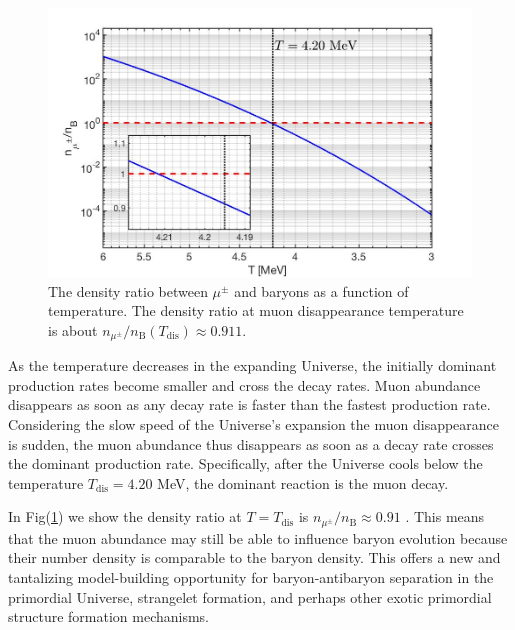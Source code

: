 \documentclass[universe,article,submit,moreauthors,pdftex,a4paper]{Definitions/mdpi}
\begin{document}
\begin{figure}[t]
\centering
\includegraphics[width=0.9\columnwidth]{./plots/DensityRatio_new2.jpg}
\caption{The density ratio between $\mu^\pm$ and baryons as a function of temperature. The density ratio at muon disappearance temperature is about $n_{\mu^\pm}/n_\mathrm{B}(T_\mathrm{dis})\approx0.911$.}
\label{muonRatio_fig} 
\end{figure}
As the temperature decreases in the expanding Universe, the initially dominant production rates become smaller and cross the decay rates. Muon abundance disappears as soon as any decay rate is faster than the fastest production rate. Considering the slow speed of the Universe's expansion the muon disappearance is sudden, the muon abundance thus disappears as soon as a decay rate crosses the dominant production rate. Specifically, after the Universe cools below the temperature $T_\mathrm{dis} = 4.20$ MeV, the dominant reaction is the muon decay.

In Fig(\ref{muonRatio_fig}) we show the density ratio at $T=T_\mathrm{dis}$ is $n_{\mu^\pm}/n_\mathrm{B}\approx0.91$ \cite{Yang:2021bko} . This means that the muon abundance may still be able to influence baryon evolution because their number density is comparable to the baryon density. This offers a new and tantalizing model-building opportunity for  baryon-antibaryon separation in the primordial Universe, strangelet formation, and perhaps other exotic primordial structure formation mechanisms.

\end{document}
